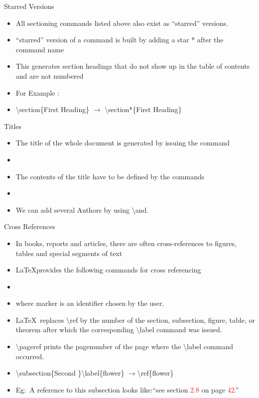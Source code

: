 \documentclass{beamer}
\begin{document}
\begin{frame}{Starred Versions}
\begin{itemize}
\pause \item All sectioning commands listed above also exist as ``starred'' versions.
\pause \item “starred” version of a command is built by adding a star * after the command
name
\pause \item This generates section headings that do not show up in the table
of contents and are not numbered
\pause \item For Example :
\pause \item[] \textbackslash section\{First Heading\} $\rightarrow$ \textbackslash section*\{First Heading\}
\end{itemize}
\end{frame}

\begin{frame}{Titles}
\begin{itemize}
\pause \item The title of the whole document is generated by issuing the command 
\pause \item[] \centering {}
\pause \item The contents of the title have to be defined by the commands
\centering \pause \item[] 
\flushleft \pause \item We can add several Authors by using \textbackslash and.
\end{itemize}
\end{frame}

\begin{frame}{Cross References}
\begin{itemize}
\pause \item In books, reports and articles, there are often cross-references to figures,
tables and special segments of text 
\pause \item \LaTeX provides the following commands for cross referencing 
\pause \item[]  
\pause \item where marker is an identifier chosen by the user.
\pause \item \LaTeX ~replaces \textbackslash ref by
the number of the section, subsection, figure, table, or theorem after which the corresponding \textbackslash label command was issued.
\pause \item \textbackslash pageref prints the pagenumber of the page where the \textbackslash label command occurred.
\item[] \textbackslash subsection\{Second \}\textbackslash label\{flower\} $\rightarrow$\textbackslash ref\{flower\}
\item[] Eg:~A reference to this subsection looks like:``see section \textcolor{red}{2.8} on page \textcolor{red}{42}.''
\end{itemize}
\end{frame}
\end{document}
